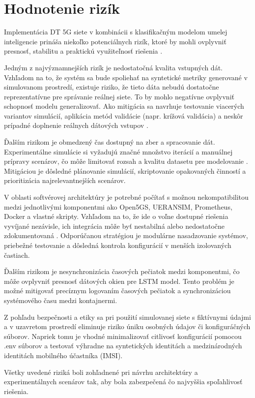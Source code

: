 \section{Hodnotenie rizík}
Implementácia DT 5G siete v kombinácii s klasifikačným modelom umelej inteligencie prináša niekoľko potenciálnych rizík, ktoré by mohli ovplyvniť presnosť, stabilitu a praktickú využiteľnosť riešenia \cite{ML_traffic}.

Jedným z najvýznamnejších rizík je nedostatočná kvalita vstupných dát. Vzhľadom na to, že systém sa bude spoliehať na syntetické metriky generované v simulovanom prostredí, existuje riziko, že tieto dáta nebudú dostatočne reprezentatívne pre správanie reálnej siete. To by mohlo negatívne ovplyvniť schopnosť modelu generalizovať. Ako mitigácia sa navrhuje testovanie viacerých variantov simulácií, aplikácia metód validácie \cite{Nguyen} (napr. krížová validácia) a neskôr prípadné doplnenie reálnych dátových vstupov \cite{data_generating}.

Ďalším rizikom je obmedzený čas dostupný na zber a spracovanie dát. Experimentálne simulácie si vyžadujú značné množstvo iterácií a manuálnej prípravy scenárov, čo môže limitovať rozsah a kvalitu datasetu pre modelovanie \cite{USAirForce}. Mitigáciou je dôsledné plánovanie simulácií, skriptovanie opakovaných činností a prioritizácia najrelevantnejších scenárov.

V oblasti softvérovej architektúry je potrebné počítať s možnou nekompatibilitou medzi jednotlivými komponentmi ako Open5GS, UERANSIM, Prometheus, Docker a vlastné skripty. Vzhľadom na to, že ide o voľne dostupné riešenia vyvíjané nezávisle, ich integrácia môže byť nestabilná alebo nedostatočne zdokumentovaná \cite{challenges_human_factor}. Odporúčanou stratégiou je modulárne nasadzovanie systémov, priebežné testovanie a dôsledná kontrola konfigurácií v menších izolovaných častiach.

Ďalším rizikom je nesynchronizácia časových pečiatok medzi komponentmi, čo môže ovplyvniť presnosť dátových okien pre LSTM model. Tento problém je možné mitigovať precíznym logovaním časových pečiatok a synchronizáciou systémového času medzi kontajnermi.

Z pohľadu bezpečnosti a etiky sa pri použití simulovanej siete s fiktívnymi údajmi a v uzavretom prostredí eliminuje riziko úniku osobných údajov či konfiguráčných súborov. Napriek tomu je vhodné minimalizovať citlivosť konfigurácií pomocou .env súborov \cite{Dt_Iot_data_worry_about} a testovať výhradne na syntetických identitách a medzinárodných identitách mobilného účastníka (IMSI).

Všetky uvedené riziká boli zohľadnené pri návrhu architektúry a experimentálnych scenárov tak, aby bola zabezpečená čo najvyššia spoľahlivosť riešenia.